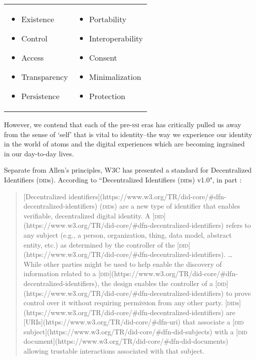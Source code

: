 \documentclass[twoside]{article}
\begin{document}
\begin{tabular}{ll}
  \begin{itemize}
    \item  Existence
    \item  Control
    \item  Access
    \item  Transparency
    \item  Persistence
  \end{itemize}
  &
  \begin{itemize}
    \item  Portability
    \item  Interoperability
    \item  Consent
    \item  Minimalization
    \item  Protection
  \end{itemize}
\end{tabular}

However, we contend that each of the pre-\textsc{ssi} eras has critically pulled us away from the sense of `self' that is vital to identity–the way we experience our identity in the world of atoms and the digital experiences which are becoming ingrained in our day-to-day lives.

Separate from Allen's principles, W3C has presented a standard for Decentralized Identifiers (\textsc{did}s). According to ``Decentralized Identifiers (\textsc{did}s) v1.0", in part \citep{W3C2022}:

\begin{quote}
[Decentralized identifiers](https://www.w3.org/TR/did-core/#dfn-decentralized-identifiers) (\textsc{did}s) are a new type of identifier that enables verifiable, decentralized digital identity. A [\textsc{did}](https://www.w3.org/TR/did-core/#dfn-decentralized-identifiers) refers to any subject (e.g., a person, organization, thing, data model, abstract entity, etc.) as determined by the controller of the [\textsc{did}](https://www.w3.org/TR/did-core/#dfn-decentralized-identifiers).
\ldots{}
While other parties might be used to help enable the discovery of information related to a [\textsc{did}](https://www.w3.org/TR/did-core/#dfn-decentralized-identifiers), the design enables the controller of a [\textsc{did}](https://www.w3.org/TR/did-core/#dfn-decentralized-identifiers) to prove control over it without requiring permi\textsc{ssi}on from any other party. [\textsc{did}s](https://www.w3.org/TR/did-core/#dfn-decentralized-identifiers) are [URIs](https://www.w3.org/TR/did-core/#dfn-uri) that associate a [\textsc{did} subject](https://www.w3.org/TR/did-core/#dfn-did-subjects) with a [\textsc{did} document](https://www.w3.org/TR/did-core/#dfn-did-documents) allowing trustable interactions associated with that subject.
\end{quote}
\end{document}
